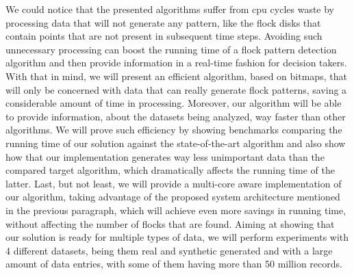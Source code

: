We could notice that the presented algorithms suffer from \ac{cpu} cycles waste by processing data that will not
generate any pattern, like the flock disks that contain points that are not present in subsequent time steps. Avoiding
such unnecessary processing can boost the running time of a flock pattern detection algorithm and then provide
information in a real-time fashion for decision takers. With that in mind, we will present an efficient algorithm, based
on bitmaps, that will only be concerned with data that can really generate flock patterns, saving a considerable amount
of time in processing. Moreover, our algorithm will be able to provide information, about the datasets being analyzed,
way faster than other algorithms. We will prove such efficiency by showing benchmarks comparing the running time of our
solution against the state-of-the-art algorithm and also show how that our implementation generates way less unimportant
data than the compared target algorithm, which dramatically affects the running time of the latter. Last, but not least,
we will provide a multi-core aware implementation of our algorithm, taking advantage of the proposed system architecture
mentioned in the previous paragraph, which will achieve even more savings in running time, without affecting the number
of flocks that are found. Aiming at showing that our solution is ready for multiple types of data, we will perform
experiments with 4 different datasets, being them real and synthetic generated and with a large amount of data entries,
with some of them having more than 50 million records.
